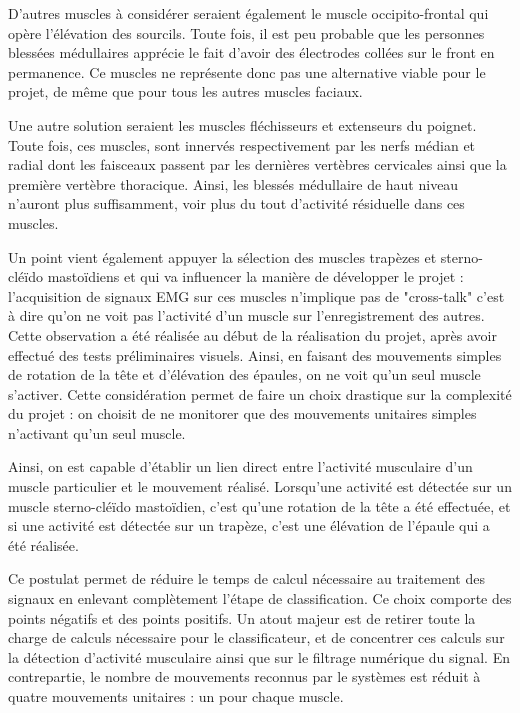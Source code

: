 \documentclass[letterpaper, twoside, 12pt, memoire, creativecommons, hyperref]{thETS}
\begin{document}
D'autres muscles à considérer seraient également le muscle occipito-frontal qui opère l'élévation des sourcils. Toute fois, il est peu probable que les personnes blessées médullaires apprécie le fait d'avoir des électrodes collées sur le front en permanence. Ce muscles ne représente donc pas une alternative viable pour le projet, de même que pour tous les autres muscles faciaux.

Une autre solution seraient les muscles fléchisseurs et extenseurs du poignet. Toute fois, ces muscles, sont innervés respectivement par les nerfs médian et radial dont les faisceaux passent par les dernières vertèbres cervicales ainsi que la première vertèbre thoracique. Ainsi, les blessés médullaire de haut niveau n'auront plus suffisamment, voir plus du tout d'activité résiduelle dans ces muscles.

Un point vient également appuyer la sélection des muscles trapèzes et sterno-cléïdo mastoïdiens et qui va influencer la manière de développer le projet : l'acquisition de signaux EMG sur ces muscles n'implique pas de "cross-talk" c'est à dire qu'on ne voit pas l'activité d'un muscle sur l'enregistrement des autres. Cette observation a été réalisée au début de la réalisation du projet, après avoir effectué des tests préliminaires visuels. Ainsi, en faisant des mouvements simples de rotation de la tête et d'élévation des épaules, on ne voit qu'un seul muscle s'activer. Cette considération permet de faire un choix drastique sur la complexité du projet : on choisit de ne monitorer que des mouvements unitaires simples n'activant qu'un seul muscle. 

Ainsi, on est capable d'établir un lien direct entre l'activité musculaire d'un muscle particulier et le mouvement réalisé. Lorsqu'une activité est détectée sur un muscle sterno-cléïdo mastoïdien, c'est qu'une rotation de la tête a été effectuée, et si une activité est détectée sur un trapèze, c'est une élévation de l'épaule qui a été réalisée.

Ce postulat permet de réduire le temps de calcul nécessaire au traitement des signaux en enlevant complètement l'étape de classification. Ce choix comporte des points négatifs et des points positifs. Un atout majeur est de retirer toute la charge de calculs nécessaire pour le classificateur, et de concentrer ces calculs sur la détection d'activité musculaire ainsi que sur le filtrage numérique du signal. En contrepartie, le nombre de mouvements reconnus par le systèmes est réduit à quatre mouvements unitaires : un pour chaque muscle. 
\end{document}
